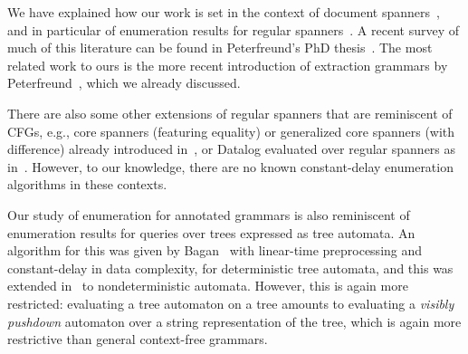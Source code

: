 We have explained how our work is set in the context of document spanners~\cite{FaginKRV15}, and in particular of enumeration results for regular spanners~\cite{FlorenzanoRUVV18,amarilli2019constant}. A recent survey of much of this literature can be found in Peterfreund's PhD thesis~\cite{peterfreund2019complexity}. The most related work to ours is the more recent introduction of extraction grammars by Peterfreund~\cite{Peterfreund21}, which we already discussed.
%

There are also some other extensions of regular spanners that are reminiscent of CFGs, e.g., core spanners (featuring equality) or generalized core spanners (with difference) already introduced in~\cite{FaginKRV15}, or Datalog evaluated over regular spanners as in~\cite{peterfreund2019recursive}. However, to our knowledge, there are no known constant-delay enumeration algorithms in these contexts.

Our study of enumeration for annotated grammars is also reminiscent of
enumeration results for queries over trees expressed as tree automata. An
algorithm for this was given by Bagan~\cite{bagan2006mso} with linear-time
preprocessing and constant-delay in data complexity, for deterministic tree
automata, and this was extended in~\cite{amarilli2019enumeration} to
nondeterministic automata. However, this is again more restricted:
evaluating a tree automaton on a tree amounts to evaluating a \emph{visibly
	pushdown} automaton over a string representation of the tree, which is again
more restrictive than general context-free grammars.
